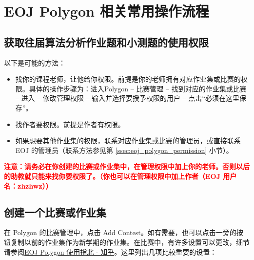 \documentclass[oneside]{book}
\begin{document}
\section{EOJ Polygon 相关常用操作流程}

\label{sec:polygon_operating_procedures}

\subsection{获取往届算法分析作业题和小测题的使用权限}

\label{ssec:permission_get}

以下是可能的方法：

\begin{itemize}
    \item 找你的课程老师，让他给你权限。前提是你的老师拥有对应作业集或比赛的权限。具体的操作步骤为：进入Polygon -- 比赛管理 -- 找到对应的作业集或比赛 -- 进入 -- 修改管理权限 -- 输入并选择要授予权限的用户 -- 点击``必须在这里保存''。
    \item 找作者要权限。前提是作者有权限。
    \item 如果想要其他作业集的权限，联系对应作业集或比赛的管理员，或直接联系 EOJ 的管理员（联系方法参见第 \ref{ssec:eoj_polygon_permission} 小节）。
\end{itemize}

\textbf{\textcolor{red}{注意：请务必在你创建的比赛或作业集中，在管理权限中加上你的老师。否则以后的助教就只能来找你要权限了。（你也可以在管理权限中加上作者（EOJ 用户名：zhzhwz））}}

\subsection{创建一个比赛或作业集}

\label{ssec:create_homework_set}

在 Polygon 的比赛管理中，点击 Add Contest。如有需要，也可以点击一旁的按钮复制以前的作业集作为新学期的作业集。在比赛中，有许多设置可以更改，细节请参阅\href{https://zhuanlan.zhihu.com/p/59869879}{EOJ Polygon 使用指北 - 知乎}。这里列出几项比较重要的设置：
\end{document}
